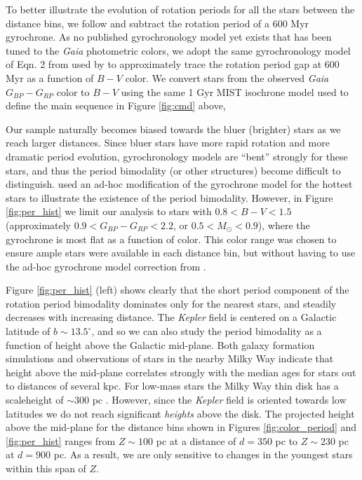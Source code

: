 \documentclass[trackchanges,preprint2]{aastex62}
\newcommand{\Kepler}{\textsl{Kepler}\xspace}
\begin{document}
To better illustrate the evolution of rotation periods for all the stars between the distance bins,  we  follow \citet{davenport2017} and subtract the rotation period of a 600 Myr gyrochrone. As no published gyrochronology model yet exists that has been tuned to the {\em Gaia} photometric colors, we adopt the same gyrochronology model of Eqn. 2 from \citet{meibom2009} used by \citet{davenport2017} to approximately trace the rotation period gap at 600 Myr as a function of $B-V$ color. We convert stars from the observed {\em Gaia} $G_{BP}-G_{RP}$ color to $B-V$ using the same 1 Gyr MIST isochrone model used to define the main sequence in Figure \ref{fig:cmd} above, 

Our sample naturally becomes biased towards the bluer (brighter) stars as we reach larger distances. Since bluer stars have more rapid rotation and more dramatic period evolution, gyrochronology models are ``bent'' strongly for these stars, and thus the period bimodality (or other structures) become difficult to distinguish. \citet{davenport2017} used an ad-hoc modification of the gyrochrone model for the hottest stars to illustrate the existence of the period bimodality. However, in Figure \ref{fig:per_hist} we limit our analysis to stars with $0.8<B-V<1.5$ (approximately $0.9<G_{BP}-G_{RP}<2.2$, or $0.5<M_\odot< 0.9$), where the gyrochrone is most flat as a function of color. This color range was chosen to ensure ample stars were available in each distance bin, but without having to use the ad-hoc gyrochrone model correction from \citet{davenport2017}.



Figure \ref{fig:per_hist} (left) shows clearly that the short period component of the rotation period bimodality dominates only for the nearest stars, and steadily decreases with increasing distance.
The \Kepler field is centered on a Galactic latitude of $b\sim13.5^\circ$, and so we can also study the period bimodality as a function of height above the Galactic mid-plane.
Both galaxy formation simulations \citep{ma2017} and observations of stars in the nearby Milky Way \citep{xiang2017} indicate that height above the mid-plane correlates strongly with the median ages for stars out to distances of several kpc. For low-mass stars the Milky Way thin disk has a scaleheight of $\sim$300 pc \citep{gilmore1983}.
However, since the \Kepler field is oriented towards low latitudes we do not reach significant {\it heights} above the disk.
The projected height above the mid-plane for the distance bins shown in Figures \ref{fig:color_period} and \ref{fig:per_hist} ranges from $Z\sim100$ pc at a distance of $d=350$ pc to $Z\sim230$ pc at $d=900$ pc. As a result, we are only sensitive to changes in the youngest stars within this span of $Z$.
\end{document}
